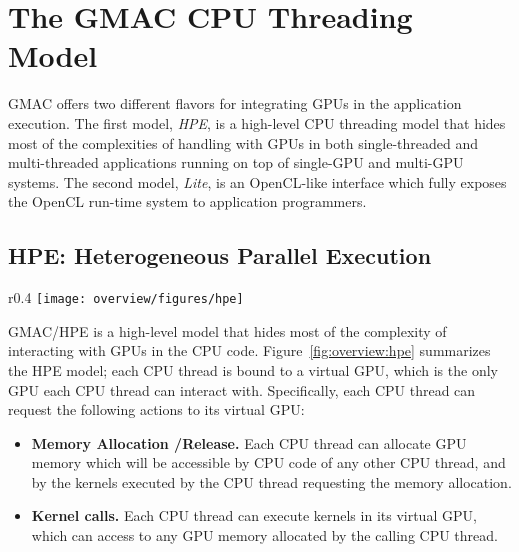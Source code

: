 \section{The GMAC CPU Threading Model}

GMAC offers two different flavors for integrating GPUs in the application execution. The first 
model, \emph{HPE}, is a high\hyp{}level CPU threading model that hides most of the complexities of 
handling with GPUs in both single\hyp{}threaded and multi\hyp{}threaded applications running on top 
of single\hyp{}GPU and multi\hyp{}GPU systems. The second model, \emph{Lite}, is an OpenCL\hyp{}like 
interface which fully exposes the OpenCL run\hyp{}time system to application programmers.

\subsection{HPE: Heterogeneous Parallel Execution}

\begin{wrapfigure}{r}{0.4\linewidth}
\vspace{-20pt}
\texttt{[image: overview/figures/hpe]}
\vspace{-20pt}
\caption{HPE CPU Threading model. Each CPU thread is bound to a GPU, where all operations requested 
by thr CPU thread are executed}
\label{fig:overview:hpe}
\vspace{-20pt}
\end{wrapfigure}

GMAC\slash HPE is a high\hyp{}level model that hides most of the complexity of interacting with GPUs 
in the CPU code. Figure~\ref{fig:overview:hpe} summarizes the HPE model; each CPU thread is bound to 
a virtual GPU, which is the only GPU each CPU thread can interact with. Specifically, each CPU 
thread can request the following actions to its virtual GPU:
\begin{itemize}
\item \textbf{Memory Allocation \slash Release.} Each CPU thread can allocate GPU memory which will 
be accessible by CPU code of any other CPU thread, and by the kernels executed by the CPU thread 
requesting the memory allocation.
\item \textbf{Kernel calls.} Each CPU thread can execute kernels in its virtual GPU, which can 
access to any GPU memory allocated by the calling CPU thread.
\end{itemize}


